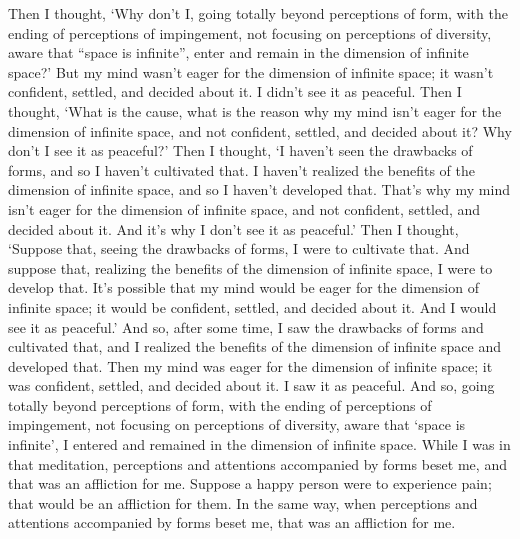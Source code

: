 \documentclass[12pt,openany]{book}%
\begin{document}
Then I thought, ‘Why don’t I, going totally beyond perceptions of form, with the ending of perceptions of impingement, not focusing on perceptions of diversity, aware that “space is infinite”, enter and remain in the dimension of infinite space?’ But my mind wasn’t eager for the dimension of infinite space; it wasn’t confident, settled, and decided about it. I didn’t see it as peaceful. Then I thought, ‘What is the cause, what is the reason why my mind isn’t eager for the dimension of infinite space, and not confident, settled, and decided about it? Why don’t I see it as peaceful?’ Then I thought, ‘I haven’t seen the drawbacks of forms, and so I haven’t cultivated that. I haven’t realized the benefits of the dimension of infinite space, and so I haven’t developed that. That’s why my mind isn’t eager for the dimension of infinite space, and not confident, settled, and decided about it. And it’s why I don’t see it as peaceful.’ Then I thought, ‘Suppose that, seeing the drawbacks of forms, I were to cultivate that. And suppose that, realizing the benefits of the dimension of infinite space, I were to develop that. It’s possible that my mind would be eager for the dimension of infinite space; it would be confident, settled, and decided about it. And I would see it as peaceful.’ And so, after some time, I saw the drawbacks of forms and cultivated that, and I realized the benefits of the dimension of infinite space and developed that. Then my mind was eager for the dimension of infinite space; it was confident, settled, and decided about it. I saw it as peaceful. And so, going totally beyond perceptions of form, with the ending of perceptions of impingement, not focusing on perceptions of diversity, aware that ‘space is infinite’, I entered and remained in the dimension of infinite space. While I was in that meditation, perceptions and attentions accompanied by forms beset me, and that was an affliction for me. Suppose a happy person were to experience pain; that would be an affliction for them. In the same way, when perceptions and attentions accompanied by forms beset me, that was an affliction for me. 
\end{document}
